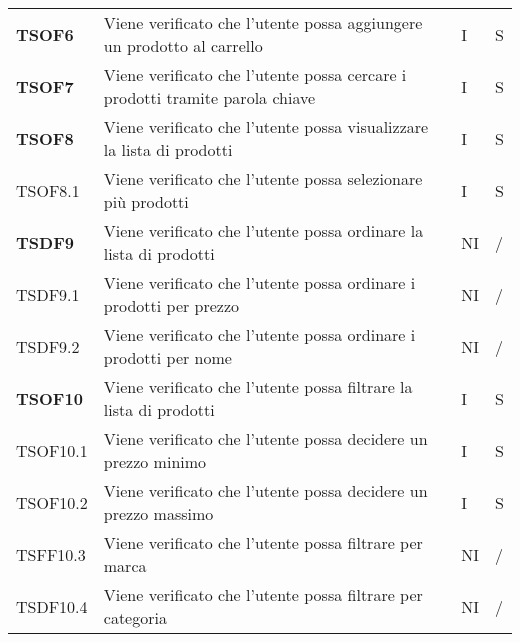 \begin{center}
\begin{longtable}[!h]{p{60px} p{240px} p{35px} p{35px}}
        \textbf{TSOF6}  & Viene verificato che l'utente possa aggiungere un prodotto al carrello                                               & I              & S              \\
        \textbf{TSOF7}  & Viene verificato che l'utente possa cercare i prodotti tramite parola chiave                                         & I              & S              \\
        \textbf{TSOF8}  & Viene verificato che l'utente possa visualizzare la lista di prodotti                                                & I              & S              \\
        TSOF8.1         & Viene verificato che l'utente possa selezionare più prodotti                                                         & I              & S              \\
        \textbf{TSDF9}  & Viene verificato che l'utente possa ordinare la lista di prodotti                                                    & NI             & /              \\
        TSDF9.1         & Viene verificato che l'utente possa ordinare i prodotti per prezzo                                                   & NI             & /              \\
        TSDF9.2         & Viene verificato che l'utente possa ordinare i prodotti per nome                                                     & NI             & /              \\
        \textbf{TSOF10} & Viene verificato che l'utente possa filtrare la lista di prodotti                                                    & I              & S              \\
        TSOF10.1        & Viene verificato che l'utente possa decidere un prezzo minimo                                                        & I              & S              \\
        TSOF10.2        & Viene verificato che l'utente possa decidere un prezzo massimo                                                       & I              & S              \\
        TSFF10.3        & Viene verificato che l'utente possa filtrare per marca                                                               & NI             & /              \\
        TSDF10.4        & Viene verificato che l'utente possa filtrare per categoria                                                           & NI             & /              \\

\end{longtable}
\end{center}
